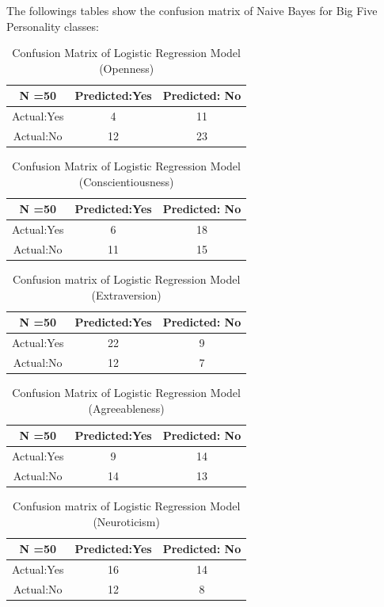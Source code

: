 The followings tables show the confusion matrix of Naive Bayes for Big Five Personality classes:
\begin{table}[!ht]
\centering
\begin{tabular}{ |c|c|c| }
 \hline
 N =50 & Predicted:Yes & Predicted: No \\
 \hline
 Actual:Yes&4 & 11 \\
 \hline
 Actual:No&12 & 23 \\
 \hline
\end{tabular}
\caption{Confusion Matrix of Logistic Regression Model (Openness)}

\end{table}

\begin{table}[!ht]
\centering
\begin{tabular}{ |c|c|c| }
 \hline
 N =50 & Predicted:Yes & Predicted: No \\
 \hline
 Actual:Yes&6 & 18 \\
 \hline
 Actual:No&11 & 15 \\
 \hline
\end{tabular}
\caption{Confusion Matrix of Logistic Regression Model (Conscientiousness)}
\end{table}

\begin{table}[!ht]
\centering
\begin{tabular}{ |c|c|c| }
 \hline
 N =50 & Predicted:Yes & Predicted: No \\
 \hline
 Actual:Yes&22 & 9 \\
 \hline
 Actual:No&12 & 7 \\
 \hline
\end{tabular}
 \caption{Confusion matrix of Logistic Regression Model (Extraversion)}
\end{table}

\begin{table}[!ht]
\centering
\begin{tabular}{ |c|c|c| }
 \hline
 N =50 & Predicted:Yes & Predicted: No \\
 \hline
 Actual:Yes&9 & 14 \\
 \hline
 Actual:No&14 & 13 \\
 \hline
\end{tabular}
 \caption{Confusion Matrix of Logistic Regression Model (Agreeableness)}
\end{table}

\begin{table}[!h]
\centering
\begin{tabular}{ |c|c|c| }
 \hline
 N =50 & Predicted:Yes & Predicted: No \\
 \hline
 Actual:Yes&16 & 14 \\
 \hline
 Actual:No&12 & 8 \\
 \hline
\end{tabular}
 \caption{Confusion matrix of Logistic Regression Model (Neuroticism)}
\end{table}


